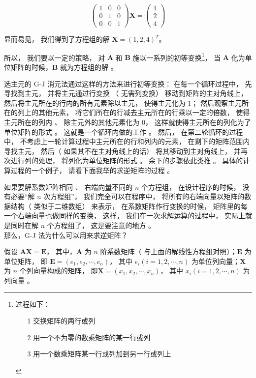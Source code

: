 \documentclass[a4paper, 8pt]{article}
\newcommand{\matr}[1]{\mathbf{#1}}
\begin{document}
\begin{equation}
\begin{pmatrix}
1&0&0\\
0&1&0\\
0&0&1
\end{pmatrix} \matr{X} = \begin{pmatrix}
1\\2\\4
\end{pmatrix}
\end{equation}

显而易见， 我们得到了方程组的解 $\matr{X}=(1, 2, 4)^T$。

	所以， 我们要以一定的策略， 对 $\matr{A}$ 和 $\matr{B}$ 施以一系列的初等变换\footnote{\label{elementary_trans} 过程如下： \begin{itemize}\item[1] 交换矩阵的两行或列
\item[2] 用一个不为零的数乘矩阵的某一行或列
\item[3] 用一个数乘矩阵某一行或列加到另一行或列上\end{itemize}}， 当 $\matr{A}$ 化为单位矩阵的时候，$\matr{B}$ 就为方程组的解 。

	选主元的 G-J 消元法通过这样的方法来进行初等变换： 在每一个循环过程中， 先寻找到主元， 并将主元通过行变换 （ 无需列变换） 移动到矩阵的主对角线上， 然后将主元所在的行内的所有元素除以主元， 使得主元化为 $1$； 然后观察主元所在的列上的其他元素， 将它们所在的行减去主元所在的行乘以一定的倍数， 使得主元所在的列内 、 除主元外的其他元素化为 $0$， 这样就使得主元所在的列化为了单位矩阵的形式 。 这就是一个循环内做的工作 。 然后， 在第二轮循环的过程中， 不考虑上一轮计算过程中主元所在的行和列内的元素， 在剩下的矩阵范围内寻找主元， 然后（ 如果其不在主对角线上的话） 将其移动到主对角线上， 并再次进行列的处理， 将列化为单位矩阵的形式 。 余下的步骤依此类推 。 具体的计算过程的一个例子， 请看下面我举的求逆矩阵的过程 。

	如果要解系数矩阵相同 、 右端向量不同的 $n$ 个方程组， 在设计程序的时候， 没有必要“解 $n$ 次方程组”， 我们完全可以在程序中， 将所有的右端向量以矩阵的数据结构（ 类似于二维数组） 来表示， 在系数矩阵作行变换的时候， 矩阵里的每一个右端向量也做同样的变换， 这样， 我们在一次求解运算的过程中， 实际上就是同时在解 $n$ 个方程组了， 这是要注意的地方 。 \\



	那么，G-J 法为什么可以用来求逆矩阵？
	
	假设 \label{ax_eq_e}$\matr{A}\matr{X}=\matr{E}$， 其中，$\matr{A}$ 为 $n$ 阶系数矩阵（ 与上面的解线性方程组对照）；$\matr{E}$ 为单位矩阵， 即 $\matr{E}=(e_1,e_2,\cdots,e_n)$， 其中 $e_i (i=1,2,\cdots,n)$ 为单位列向量；$\matr{X}$ 为 $n$ 个列向量构成的矩阵， 即$\matr{X}=(x_1,x_2,\cdots,x_n)$， 其中 $x_i (i=1,2,\cdots,n)$ 为列向量 。
\end{document}
